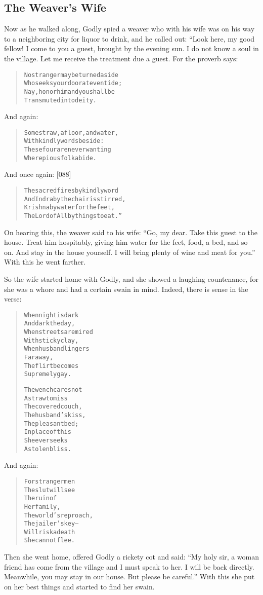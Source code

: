 \documentclass[article, twoside, 14pt]{memoir}
\renewenvironment{verbatim}{%
\begin{quote}%
\vskip -10pt%
\begin{alltt}\normalfont\large}{\end{alltt}%
\end{quote}%
\vskip -10pt
} %
\begin{document}
\subsection{The Weaver's Wife}

\label{s7}

Now as he walked along, Godly spied a weaver who with his wife was
on his way to a neighboring city for liquor to drink, and he called
out: “Look here, my good fellow! I come to you a guest, brought by
the evening sun. I do not know a soul in the village. Let me
receive the treatment due a guest. For the proverb says:

\begin{verbatim}
No stranger may be turned aside
Who seeks your door at eventide;
Nay, honor him and you shall be
Transmuted into deity.
\end{verbatim}
And again:

\begin{verbatim}
Some straw, a floor, and water,
    With kindly words beside:
These four are never wanting
    Where pious folk abide.
\end{verbatim}
And once again: [088]

\begin{verbatim}
The sacred fires by kindly word
And Indra by the chair is stirred,
Krishna by water for the feet,
The Lord of All by things to eat.”
\end{verbatim}
On hearing this, the weaver said to his wife:
``Go, my dear. Take this guest to the house. Treat him hospitably, giving him water for the feet, food, a bed, and so on. And stay in the house yourself. I will bring plenty of wine and meat for you.''
With this he went farther.

So the wife started home with Godly, and she showed a laughing
countenance, for she was a whore and had a certain swain in mind.
Indeed, there is sense in the verse:

\begin{verbatim}
When night is dark
    And dark the day,
When streets are mired
    With sticky clay,
When husband lingers
    Far away,
The flirt becomes
    Supremely gay.

The wench cares not
    A straw to miss
The covered couch,
    The husband's kiss,
The pleasant bed;
    In place of this
She ever seeks
    A stolen bliss.
\end{verbatim}
And again:

\begin{verbatim}
For stranger men
    The slut will see
The ruin of
    Her family,
The world's reproach,
    The jailer's key--
Will risk a death
    She cannot flee.
\end{verbatim}
Then she went home, offered Godly a rickety cot and said:
``My holy sir, a woman friend has come from the village and I must speak to her. I will be back directly. Meanwhile, you may stay in our house. But please be careful.''
With this she put on her best things and started to find her
swain.
\end{document}
